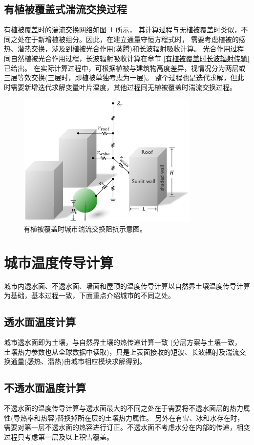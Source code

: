 \subsection{有植被覆盖式湍流交换过程}
有植被覆盖时的湍流交换网络如图~\ref{fig:有植被覆盖时城市湍流交换阻抗示意图} 所示，
其计算过程与无植被覆盖时类似，不同之处在于新增植被组分。因此，在建立通量守恒方程式时，
需要考虑植被的感热、潜热交换，涉及到植被光合作用(蒸腾)和长波辐射吸收计算。
光合作用过程同自然植被光合作用过程，长波辐射吸收计算在章节 \ref{有植被覆盖时长波辐射传输} 已给出。
在实际计算过程中，可根据植被与建筑物高度差异，视情况分为两层或三层等效交换(三层时，即植被单独考虑为一层)。
整个过程也是迭代求解，但此时需要新增迭代求解变量叶片温度，其他过程同无植被覆盖时湍流交换过程。
{
\begin{figure}[]
\centering
\includegraphics{Figures/城市模式/有植被覆盖时城市湍流交换阻抗示意图.png}
\caption{有植被覆盖时城市湍流交换阻抗示意图。}
\label{fig:有植被覆盖时城市湍流交换阻抗示意图}
\end{figure}
}


\section{城市温度传导计算}
城市内透水面、不透水面、墙面和屋顶的温度传导计算以自然界土壤温度传导计算为基础，基本过程一致，下面重点介绍城市的不同之处。

\subsection{透水面温度计算}
城市透水面即为土壤，与自然界土壤的热传递计算一致 (分层方案与土壤一致，
土壤热力参数也从全球数据中读取)，只是上表面接收的短波、长波辐射及湍流交换通量(感热、潜热)由城市相应模块求解得到。

\subsection{不透水面温度计算}
不透水面的温度传导计算与透水面最大的不同之处在于需要将不透水面层的热力属性(导热率和热容)替换掉所在层的土壤热力属性。
另外在有雪、冰和水存在时，需要对第一层不透水面的热容进行订正。不透水面不考虑水分在内部的传递，相变过程只考虑第一层及以上积雪覆盖。

